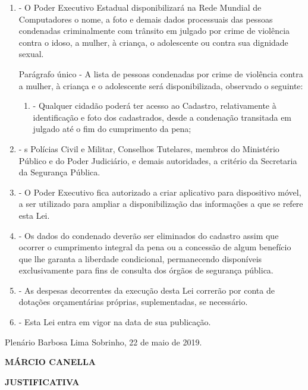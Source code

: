 \documentclass[10pt]{article}
\begin{document}
\begin{enumerate}[label=Art. \arabic*\textdegree]
\item - O Poder Executivo Estadual disponibilizará na Rede Mundial de Computadores o nome, a foto e demais dados processuais das pessoas condenadas criminalmente com trânsito em julgado por crime de violência contra o idoso, a mulher, à criança, o adolescente ou contra sua dignidade sexual.

Parágrafo único - A lista de pessoas condenadas por crime de violência contra a mulher, à criança e o adolescente será disponibilizada, observado o seguinte:

\begin{enumerate}[label=\Roman*]
\item - Qualquer cidadão poderá ter acesso ao Cadastro, relativamente à identificação e foto dos cadastrados, desde a condenação transitada em julgado até o fim do cumprimento da pena;
\end{enumerate}
 
\item - s Polícias Civil e Militar, Conselhos Tutelares, membros do Ministério Público e do Poder Judiciário, e demais autoridades, a critério da Secretaria da Segurança Pública.

\item - O Poder Executivo fica autorizado a criar aplicativo para dispositivo móvel, a ser utilizado para ampliar a disponibilização das informações a que se refere esta Lei.

\item - Os dados do condenado deverão ser eliminados do cadastro assim que ocorrer o cumprimento integral da pena ou a concessão de algum benefício que lhe garanta a liberdade condicional, permanecendo disponíveis exclusivamente para fins de consulta dos órgãos de segurança pública.

\item - As despesas decorrentes da execução desta Lei correrão por conta de dotações orçamentárias próprias, suplementadas, se necessário.

\item - Esta Lei entra em vigor na data de sua publicação. 


\end{enumerate}




\begin{center}
  Plenário Barbosa Lima Sobrinho, 22 de maio de 2019.

   \bigskip

  \textbf{ MÁRCIO CANELLA}

  \bigskip

  \textbf{JUSTIFICATIVA}
  \bigskip

\end{center}
\end{document}
